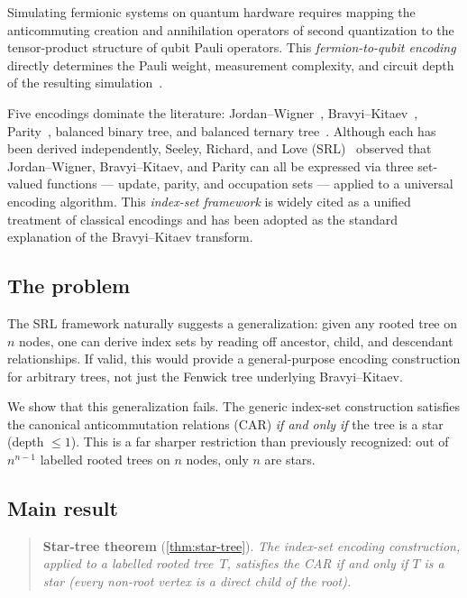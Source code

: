 
Simulating fermionic systems on quantum hardware requires mapping the
anticommuting creation and annihilation operators of second quantization
to the tensor-product structure of qubit Pauli operators.  This
\emph{fermion-to-qubit encoding} directly determines the Pauli weight,
measurement complexity, and circuit depth of the resulting
simulation~\cite{tranter2015, havlicek2017}.

Five encodings dominate the literature: Jordan--Wigner~\cite{jordan1928},
Bravyi--Kitaev~\cite{bravyi2002, seeley2012}, Parity~\cite{seeley2012,
bravyi2017tapering}, balanced binary tree, and balanced ternary
tree~\cite{jiang2020, miller2023bonsai}.  Although each has been derived
independently, Seeley, Richard, and Love (SRL)~\cite{seeley2012}
observed that Jordan--Wigner, Bravyi--Kitaev, and Parity can all be
expressed via three set-valued functions --- update, parity, and
occupation sets --- applied to a universal encoding algorithm.  This
\emph{index-set framework} is widely cited as a unified treatment of
classical encodings and has been adopted as the standard explanation of
the Bravyi--Kitaev transform.

\subsection{The problem}

The SRL framework naturally suggests a generalization: given any rooted
tree on $n$ nodes, one can derive index sets by reading off ancestor,
child, and descendant relationships.  If valid, this would provide a
general-purpose encoding construction for arbitrary trees, not just the
Fenwick tree underlying Bravyi--Kitaev.

We show that this generalization fails.  The generic index-set
construction satisfies the canonical anticommutation relations (CAR)
\emph{if and only if} the tree is a star (depth $\le 1$).  This is a
far sharper restriction than previously recognized: out of $n^{n-1}$
labelled rooted trees on $n$ nodes, only $n$ are stars.

\subsection{Main result}

\begin{quotation}
\noindent\textbf{Star-tree theorem} (\cref{thm:star-tree}).
\emph{The index-set encoding construction, applied to a labelled
rooted tree~$T$, satisfies the CAR if and only if $T$ is a star
(every non-root vertex is a direct child of the root).}
\end{quotation}

